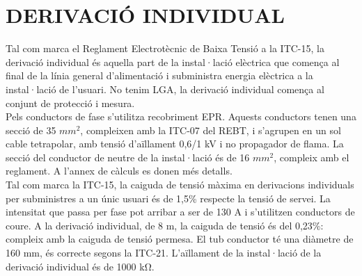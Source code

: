 \chapter{\uppercase{Derivació individual}}
Tal com marca el Reglament Electrotècnic de Baixa Tensió a la ITC-15, la derivació individual és aquella part de la instal·lació elèctrica que comença al final de la línia general d'alimentació i subministra energia elèctrica a la instal·lació de l'usuari. No tenim LGA, la derivació individual comença al conjunt de protecció i mesura.\\
\newline Pels conductors de fase s'utilitza recobriment EPR. Aquests conductors tenen una secció de 35 $mm^2$, compleixen amb la ITC-07 del REBT, i s'agrupen en un sol cable tetrapolar, amb tensió d'aïllament 0,6/1 kV i no propagador de flama. La secció del conductor de neutre de la instal·lació és de 16 $mm^2$, compleix amb el reglament. A l'annex de càlculs es donen més detalls.\\
\newline  Tal com marca la ITC-15, la caiguda de tensió màxima en derivacions individuals per subministres a un únic usuari és de 1,5\% respecte la tensió de servei. La intensitat que passa per fase pot arribar a ser de 130 A i s'utilitzen conductors de coure. A la derivació individual, de 8 m, la caiguda de tensió és del 0,23\%: compleix amb la caiguda de tensió permesa. El tub conductor té una diàmetre de 160 mm, és correcte segons la ITC-21. L'aïllament de la instal·lació de la derivació individual és de 1000 k$\si{\ohm}$.




\clearpage